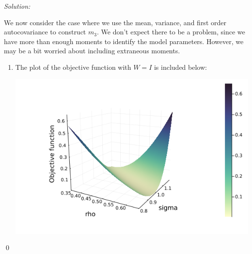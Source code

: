 \documentclass[12pt]{article}
\newenvironment{sol}
    {\emph{Solution:}
    }
    {
    \qed
    }
\begin{document}
\begin{sol}
    We now consider the case where we use the mean, variance, and first order autocovariance to construct $m_3$. We don't expect there to be a problem, since we have more than enough moments to identify the model parameters. However, we may be a bit worried about including extraneous moments.
    \begin{enumerate}[label=\alph*) ]
        \item The plot of the objective function with $W = I$ is included below:
        \begin{center}
            \includegraphics[scale=0.4]{jthplot_3_init.png}
        \end{center}
        

\end{enumerate}
\end{sol}
\end{document}
